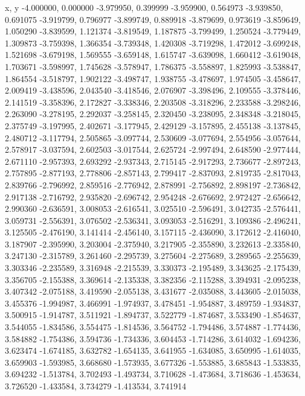 x, y
-4.000000, 0.000000
-3.979950, 0.399999
-3.959900, 0.564973
-3.939850, 0.691075
-3.919799, 0.796977
-3.899749, 0.889918
-3.879699, 0.973619
-3.859649, 1.050290
-3.839599, 1.121374
-3.819549, 1.187875
-3.799499, 1.250524
-3.779449, 1.309873
-3.759398, 1.366354
-3.739348, 1.420308
-3.719298, 1.472012
-3.699248, 1.521698
-3.679198, 1.569555
-3.659148, 1.615747
-3.639098, 1.660412
-3.619048, 1.703671
-3.598997, 1.745628
-3.578947, 1.786375
-3.558897, 1.825993
-3.538847, 1.864554
-3.518797, 1.902122
-3.498747, 1.938755
-3.478697, 1.974505
-3.458647, 2.009419
-3.438596, 2.043540
-3.418546, 2.076907
-3.398496, 2.109555
-3.378446, 2.141519
-3.358396, 2.172827
-3.338346, 2.203508
-3.318296, 2.233588
-3.298246, 2.263090
-3.278195, 2.292037
-3.258145, 2.320450
-3.238095, 2.348348
-3.218045, 2.375749
-3.197995, 2.402671
-3.177945, 2.429129
-3.157895, 2.455138
-3.137845, 2.480712
-3.117794, 2.505865
-3.097744, 2.530609
-3.077694, 2.554956
-3.057644, 2.578917
-3.037594, 2.602503
-3.017544, 2.625724
-2.997494, 2.648590
-2.977444, 2.671110
-2.957393, 2.693292
-2.937343, 2.715145
-2.917293, 2.736677
-2.897243, 2.757895
-2.877193, 2.778806
-2.857143, 2.799417
-2.837093, 2.819735
-2.817043, 2.839766
-2.796992, 2.859516
-2.776942, 2.878991
-2.756892, 2.898197
-2.736842, 2.917138
-2.716792, 2.935820
-2.696742, 2.954248
-2.676692, 2.972427
-2.656642, 2.990360
-2.636591, 3.008053
-2.616541, 3.025510
-2.596491, 3.042735
-2.576441, 3.059731
-2.556391, 3.076502
-2.536341, 3.093053
-2.516291, 3.109386
-2.496241, 3.125505
-2.476190, 3.141414
-2.456140, 3.157115
-2.436090, 3.172612
-2.416040, 3.187907
-2.395990, 3.203004
-2.375940, 3.217905
-2.355890, 3.232613
-2.335840, 3.247130
-2.315789, 3.261460
-2.295739, 3.275604
-2.275689, 3.289565
-2.255639, 3.303346
-2.235589, 3.316948
-2.215539, 3.330373
-2.195489, 3.343625
-2.175439, 3.356705
-2.155388, 3.369614
-2.135338, 3.382356
-2.115288, 3.394931
-2.095238, 3.407342
-2.075188, 3.419590
-2.055138, 3.431677
-2.035088, 3.443605
-2.015038, 3.455376
-1.994987, 3.466991
-1.974937, 3.478451
-1.954887, 3.489759
-1.934837, 3.500915
-1.914787, 3.511921
-1.894737, 3.522779
-1.874687, 3.533490
-1.854637, 3.544055
-1.834586, 3.554475
-1.814536, 3.564752
-1.794486, 3.574887
-1.774436, 3.584882
-1.754386, 3.594736
-1.734336, 3.604453
-1.714286, 3.614032
-1.694236, 3.623474
-1.674185, 3.632782
-1.654135, 3.641955
-1.634085, 3.650995
-1.614035, 3.659903
-1.593985, 3.668680
-1.573935, 3.677326
-1.553885, 3.685843
-1.533835, 3.694232
-1.513784, 3.702493
-1.493734, 3.710628
-1.473684, 3.718636
-1.453634, 3.726520
-1.433584, 3.734279
-1.413534, 3.741914
